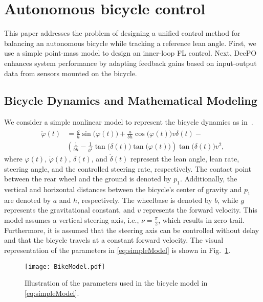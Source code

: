 \section{Autonomous bicycle control}
\label{sec:2}
This paper addresses the problem of designing a unified control method for balancing an autonomous bicycle while tracking a reference lean angle. First, we use a simple point-mass model to design an inner-loop FL control. Next, DeePO enhances system performance by adapting feedback gains based on input-output data from sensors mounted on the bicycle. 

\subsection{Bicycle Dynamics and Mathematical Modeling}
We consider a simple nonlinear model to represent the bicycle dynamics as in~\cite{Persson_2024}. 
\begin{equation}
    \label{eq:simpleModel}
    \begin{aligned}
        \ddot{\varphi}(t)&=\frac{g}{h}\sin\big(\varphi(t)\big)+ \frac{a}{bh}\cos\big(\varphi(t)\big)v\dot\delta(t) -\\
        & \left(\frac{1}{bh}- \frac{1}{b^2}\tan\big(\delta(t)\big) \tan\big(\varphi(t)\big)\right)\tan\big(\delta(t)\big)v^2,
    \end{aligned}
\end{equation}
where $\varphi(t)$, $\dot{\varphi}(t)$, $\delta(t)$, and $\dot{\delta}(t)$ represent the lean angle, lean rate, steering angle, and the controlled steering rate, respectively. The contact point between the rear wheel and the ground is denoted by $p_1$. Additionally, the vertical and horizontal distances between the bicycle's center of gravity and $p_1$ are denoted by $a$ and $h$, respectively. The wheelbase is denoted by $b$, while $g$ represents the gravitational constant, and $v$ represents the forward velocity. This model assumes a vertical steering axis, i.e., $\nu = \frac{\pi}{2}$, which results in zero trail. Furthermore, it is assumed that the steering axis can be controlled without delay and that the bicycle travels at a constant forward velocity. The visual representation of the parameters in \eqref{eq:simpleModel} is shown in Fig.~\ref{fig:BikeModel}.

\begin{figure}[t]
    \centering
    \texttt{[image: BikeModel.pdf]}
    \caption{Illustration of the parameters used in the bicycle model in \eqref{eq:simpleModel}.}
    \label{fig:BikeModel}
\end{figure}

